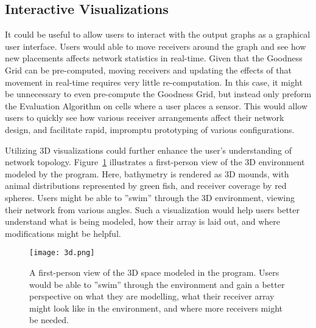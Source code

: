 \subsection{Interactive Visualizations}
It could be useful to allow users to interact with the output graphs as a graphical user interface.  Users would able to move receivers around the graph and see how new placements affects network statistics in real-time.  Given that the Goodness Grid can be pre-computed, moving receivers and updating the effects of that movement in real-time requires very little re-computation.  In this case, it might be unnecessary to even pre-compute the Goodness Grid, but instead only preform the Evaluation Algorithm on cells where a user places a sensor.  This would allow users to quickly see how various receiver arrangements affect their network design, and facilitate rapid, impromptu prototyping of various configurations.  

Utilizing 3D visualizations could further enhance the user's understanding of network topology.  Figure~\ref{3d} illustrates a first-person view of the 3D environment modeled by the program.  Here, bathymetry is rendered as 3D mounds, with animal distributions represented by green fish, and receiver coverage by red spheres.  Users might be able to ''swim'' through the 3D environment, viewing their network from various angles.  Such a visualization would help users better understand what is being modeled, how their array is laid out, and where modifications might be helpful.

\begin{figure}[ht]
	\texttt{[image: 3d.png]}
	\caption{A first-person view of the 3D space modeled in the program.  Users would be able to ''swim'' through the environment and gain a better perspective on what they are modelling, what their receiver array might look like in the environment, and where more receivers might be needed.\label{3d}}
\end{figure}
